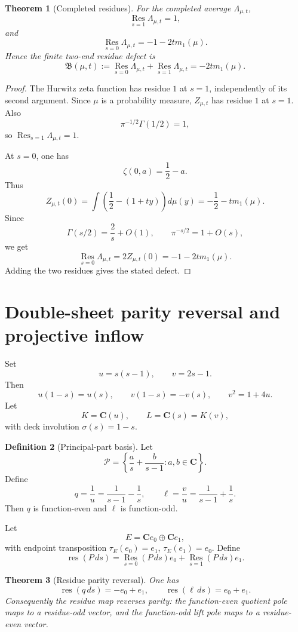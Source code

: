 \documentclass[11pt]{article}
\newcommand{\C}{\mathbf C}
\newcommand{\Res}{\operatorname*{Res}}
\theoremstyle{plain}
\newtheorem{theorem}{Theorem}[section]
\theoremstyle{definition}
\newtheorem{definition}[theorem]{Definition}
\begin{document}
\begin{theorem}[Completed residues]\label{thm:completed-residues}
For the completed average \(\Lambda_{\mu,t}\),
\[
   \Res_{s=1}\Lambda_{\mu,t}=1,
\]
and
\[
   \Res_{s=0}\Lambda_{\mu,t}=-1-2t m_1(\mu).
\]
Hence the finite two-end residue defect is
\[
   \mathfrak B(\mu,t):=\Res_{s=0}\Lambda_{\mu,t}+\Res_{s=1}\Lambda_{\mu,t}
   =-2t m_1(\mu).
\]
\end{theorem}

\begin{proof}
The Hurwitz zeta function has residue \(1\) at \(s=1\), independently of its second argument.  Since \(\mu\) is a probability measure, \(Z_{\mu,t}\) has residue \(1\) at \(s=1\).  Also
\[
   \pi^{-1/2}\Gamma(1/2)=1,
\]
so \(\Res_{s=1}\Lambda_{\mu,t}=1\).

At \(s=0\), one has
\[
   \zeta(0,a)=\frac12-a.
\]
Thus
\[
   Z_{\mu,t}(0)=\int\left(\frac12-(1+ty)\right)d\mu(y)
   =-\frac12-tm_1(\mu).
\]
Since
\[
   \Gamma(s/2)=\frac2s+O(1),
   \qquad
   \pi^{-s/2}=1+O(s),
\]
we get
\[
   \Res_{s=0}\Lambda_{\mu,t}=2Z_{\mu,t}(0)=-1-2tm_1(\mu).
\]
Adding the two residues gives the stated defect.
\end{proof}

\section{Double-sheet parity reversal and projective inflow}

Set
\[
   u=s(s-1),\qquad v=2s-1.
\]
Then
\[
   u(1-s)=u(s),\qquad v(1-s)=-v(s),\qquad v^2=1+4u.
\]
Let
\[
   K=\C(u),\qquad L=\C(s)=K(v),
\]
with deck involution \(\sigma(s)=1-s\).

\begin{definition}[Principal-part basis]\label{def:principal-basis}
Let
\[
   \mathcal P=\left\{\frac a s+\frac b{s-1}:a,b\in\C\right\}.
\]
Define
\[
   q=\frac1u=\frac1{s-1}-\frac1s,
   \qquad
   \ell=\frac vu=\frac1{s-1}+\frac1s.
\]
Then \(q\) is function-even and \(\ell\) is function-odd.
\end{definition}

Let
\[
   E=\C e_0\oplus\C e_1,
\]
with endpoint transposition \(\tau_E(e_0)=e_1\), \(\tau_E(e_1)=e_0\).  Define
\[
   \operatorname{res}(P\,ds)=\Res_{s=0}(P\,ds)e_0+\Res_{s=1}(P\,ds)e_1.
\]

\begin{theorem}[Residue parity reversal]\label{thm:residue-reversal}
One has
\[
   \operatorname{res}(q\,ds)=-e_0+e_1,
   \qquad
   \operatorname{res}(\ell\,ds)=e_0+e_1.
\]
Consequently the residue map reverses parity: the function-even quotient pole maps to a residue-odd vector, and the function-odd lift pole maps to a residue-even vector.
\end{theorem}
\end{document}
